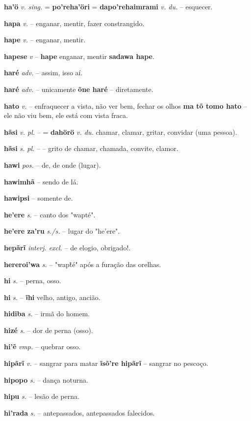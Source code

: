\textbf{ha'ö} \textit{v. sing.} = \textbf{po'reha'öri} = \textbf{dapo'rehaimrami} \textit{v. du.} -- esquecer.

\textbf{hapa} \textit{v.} -- enganar, mentir, fazer constrangido.

\textbf{hape} \textit{v.} -- enganar, mentir.

\textbf{hapese} \textit{v} -- \textbf{hape} enganar, mentir  \textbf{sadawa hape}.

\textbf{haré} \textit{adv.} -- assim, isso aí.

\textbf{haré} \textit{adv.} -- unicamente  \textbf{õne haré} -- diretamente.

\textbf{hato} \textit{v.} -- enfraquecer a vista, não ver bem, fechar os olhos  \textbf{ma tõ tomo hato} -- ele não viu bem, ele está com vista fraca.

\textbf{hãsi} \textit{v. pl.} -- = \textbf{dahörö} \textit{v. du.} chamar, clamar, gritar, convidar (uma pessoa).

\textbf{hãsi} \textit{s. pl.} -- -- grito de chamar, chamada, convite, clamor.

\textbf{hawi} \textit{pos.} -- de, de onde (lugar).

\textbf{hawimhã} -- sendo de lá.

\textbf{hawipsi} -- somente de.

\textbf{he'ere} \textit{s.} -- canto dos "wapté".

\textbf{he'ere za'ru} \textit{s./s.} -- lugar do "he'ere".

\textbf{hepãrĩ} \textit{interj. excl.} -- de elogio, obrigado!.

\textbf{hereroi'wa} \textit{s.} -- "wapt̃é" após a furação das orelhas.

\textbf{hi} \textit{s.} -- perna, osso.

\textbf{hi} \textit{s.} -- \textbf{ĩhi} velho, antigo, ancião.

\textbf{hidiba} \textit{s.} -- irmã do homem.

\textbf{hizé} \textit{s.} -- dor de perna (osso).

\textbf{hi'ẽ} \textit{vmp.} -- quebrar osso.

\textbf{hipãrĩ} \textit{v.} -- sangrar para matar  \textbf{ĩsõ're hipãrĩ} -- sangrar no pescoço.

\textbf{hipopo} \textit{s.} -- dança noturna.

\textbf{hipu} \textit{s.} -- lesão de perna.

\textbf{hi'rada} \textit{s.} -- antepassados, antepassados falecidos.

